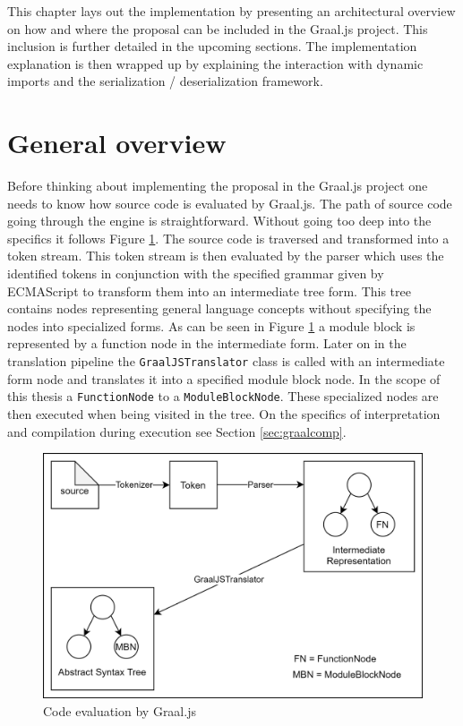 This chapter lays out the implementation by presenting an architectural overview on how and where the proposal can be included in the Graal.js project. This inclusion is further detailed in the upcoming sections. The implementation explanation is then wrapped up by explaining the interaction with dynamic imports and the serialization / deserialization framework.

\section{General overview}
Before thinking about implementing the proposal in the Graal.js project one needs to know how source code is evaluated by Graal.js. The path of source code going through the engine is straightforward. Without going too deep into the specifics it follows Figure \ref{fig:mainImpl}. The source code is traversed and transformed into a token stream. This token stream is then evaluated by the parser which uses the identified tokens in conjunction with the specified grammar given by ECMAScript \cite{ecma} to transform them into an intermediate tree form. This tree contains nodes representing general language concepts without specifying the nodes into specialized forms. As can be seen in Figure \ref{fig:mainImpl} a module block is represented by a function node in the intermediate form. Later on in the translation pipeline the \texttt{GraalJSTranslator} class is called with an intermediate form node and translates it into a specified module block node. In the scope of this thesis a \texttt{FunctionNode} to a \texttt{ModuleBlockNode}. These specialized nodes are then executed when being visited in the tree. On the specifics of interpretation and compilation during execution see Section \ref{sec:graalcomp}. 

\begin{figure}[h!]
    \centering
    \includegraphics[scale=0.165]{figures/implMain.png}
    \caption{Code evaluation by Graal.js}
    \label{fig:mainImpl}
\end{figure}

